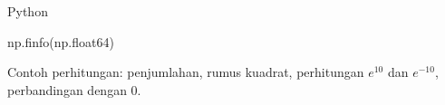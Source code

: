 \begin{frame}{Python}

np.finfo(np.float64)

Contoh perhitungan: penjumlahan, rumus kuadrat, perhitungan $e^{10}$
dan $e^{-10}$, perbandingan dengan 0.

\end{frame}

